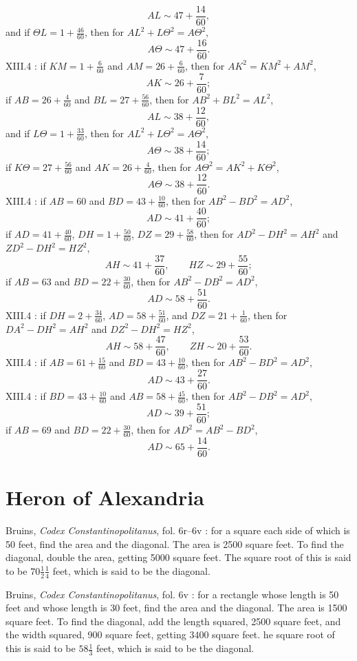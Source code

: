 \documentclass{amsart}
\theoremstyle{definition}
\begin{document}
\[
AL \sim 47+\frac{14}{60},
\]
and if $\Theta L = 1+\frac{46}{60}$, then for $AL^2+L\Theta^2=A\Theta^2$,
\[
A\Theta \sim 47+\frac{16}{60}.
\]
XIII.4 \cite[p.~621]{almagest}: if $KM=1+\frac{6}{60}$ and $AM=26+\frac{6}{60}$, then for $AK^2=KM^2+AM^2$,
\[
AK \sim 26+\frac{7}{60};
\]
if $AB=26+\frac{4}{60}$ and $BL=27+\frac{56}{60}$, then for $AB^2+BL^2=AL^2$,
\[
AL \sim 38+\frac{12}{60},
\]
and if $L\Theta = 1+\frac{33}{60}$, then for $AL^2+L\Theta^2=A\Theta^2$,
\[
A\Theta \sim 38+\frac{14}{60};
\]
if $K\Theta = 27+\frac{56}{60}$ and $AK=26+\frac{4}{60}$, then for $A\Theta^2=AK^2+K\Theta^2$,
\[
A\Theta \sim 38+\frac{12}{60}.
\]
XIII.4 \cite[p.~626]{almagest}: if $AB=60$ and $BD=43+\frac{10}{60}$, then for $AB^2-BD^2=AD^2$,
\[
AD \sim 41+\frac{40}{60};
\]
if $AD=41+\frac{40}{60}$, $DH=1+\frac{50}{60}$, $DZ=29+\frac{58}{60}$,
then for $AD^2-DH^2=AH^2$ and $ZD^2-DH^2=HZ^2$,
\[
AH \sim 41+\frac{37}{60},\qquad HZ \sim 29+\frac{55}{60};
\]
if $AB=63$ and $BD=22+\frac{30}{60}$, then for $AB^2-DB^2=AD^2$,
\[
AD \sim 58+\frac{51}{60}.
\]
XIII.4 \cite[p.~627]{almagest}: if $DH=2+\frac{34}{60}$, $AD=58+\frac{51}{60}$, and
$DZ=21+\frac{1}{60}$, then for $DA^2-DH^2=AH^2$ and $DZ^2-DH^2=HZ^2$,
\[
AH \sim 58+\frac{47}{60},\qquad ZH \sim 20+\frac{53}{60}.
\]
XIII.4 \cite[p.~628]{almagest}: if $AB=61+\frac{15}{60}$ and $BD=43+\frac{10}{60}$, then for $AB^2-BD^2=AD^2$,
\[
AD \sim 43+\frac{27}{60}.
\]
XIII.4 \cite[p.~629]{almagest}: if $BD=43+\frac{10}{60}$ and $AB=58+\frac{45}{60}$, then for $AB^2-DB^2=AD^2$,
\[
AD \sim 39+\frac{51}{60};
\]
if $AB=69$ and $BD=22+\frac{30}{60}$, then for $AD^2=AB^2-BD^2$,
\[
AD \sim 65+\frac{14}{60}.
\]









\section{Heron of Alexandria}
Bruins, {\em Codex Constantinopolitanus}, fol. 6r--6v \cite[p.~6]{constantinopolitanus}: 
for a square each side of which is 50 feet, find the area and the diagonal. The area is 2500 square feet.
To find the diagonal, double the area, getting 5000 square feet. 
The square root of this is said to be $70 \frac{1}{2} \frac{1}{4}$ feet, which is said to be the diagonal.
 
Bruins, {\em Codex Constantinopolitanus}, fol. 6v \cite[p.~6]{constantinopolitanus}: for a rectangle whose length is 50 feet and whose
length is 30 feet, find the area and the diagonal.
The area is 1500 square feet. To find the diagonal, add the length squared, 2500 square feet,
and the width squared, 900 square feet, getting $3400$ square feet. he square root of this is said to be
$58 \frac{1}{3}$ feet, which is said to be the diagonal.
\end{document}

